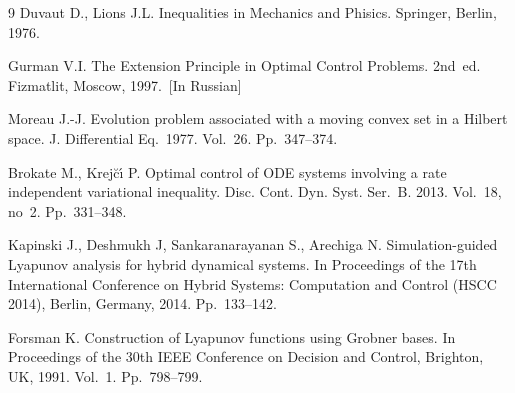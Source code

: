 \documentclass[12pt]{llncs}
\begin{document}
\begin{thebibliography}{9} %
 Duvaut D., Lions J.L. Inequalities in Mechanics and Phisics. Springer, Berlin, 1976.

  Gurman V.I. The Extension Principle in Optimal Control Problems. 2nd~ed. Fizmatlit, Moscow, 1997.~[In Russian]

 Moreau J.-J. Evolution problem associated with a moving convex set in a Hilbert space. J. Differential Eq.~1977. Vol.~26. Pp.~347--374.

  Brokate M., Krej\u{c}\'{\i} P. Optimal control of ODE systems involving a rate independent variational inequality. Disc. Cont. Dyn. Syst. Ser.~B. 2013. Vol.~18, no~2. Pp.~331--348.

 Kapinski J., Deshmukh J, Sankaranarayanan S., Arechiga N. Simulation-guided Lyapunov analysis for hybrid dynamical systems. In Proceedings of the 17th International Conference on Hybrid Systems: Computation and Control (HSCC 2014), Berlin, Germany, 2014. Pp.~133--142.

 Forsman K. Construction of Lyapunov functions using Grobner bases. In Proceedings of the 30th IEEE Conference on Decision and Control, Brighton, UK, 1991. Vol.~1. Pp.~798--799.

\end{thebibliography}
\end{document}
